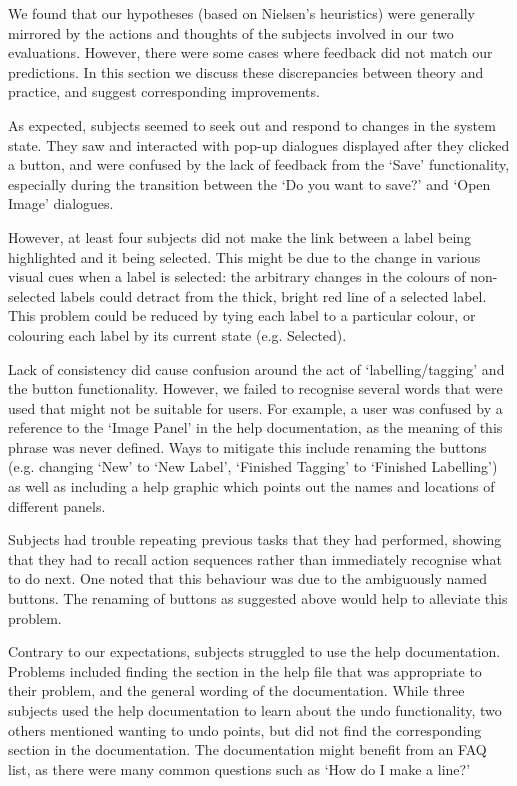 \documentclass[11pt,twocolumn]{article}
\begin{document}
We found that our hypotheses (based on Nielsen's heuristics) were generally
mirrored by the actions and thoughts of the subjects involved in our two
evaluations. However, there were some cases where feedback did not match our
predictions. In this section we discuss these discrepancies between theory and
practice, and suggest corresponding improvements.

As expected, subjects seemed to seek out and respond to changes in the system
state. They saw and interacted with pop-up dialogues displayed after they
clicked a button, and were confused by the lack of feedback from the `Save'
functionality, especially during the transition between the `Do you want to
save?' and `Open Image' dialogues. 

However, at least four subjects did not make the link between a label being
highlighted and it being selected. This might be due to the change in various
visual cues when a label is selected: the arbitrary changes in the colours of
non-selected labels could detract from the thick, bright red line of a selected
label. This problem could be reduced by tying each label to a particular
colour, or colouring each label by its current state (e.g. Selected).

Lack of consistency did cause confusion around the act of `labelling/tagging'
and the button functionality. However, we failed to recognise several words
that were used that might not be suitable for users. For example, a user was
confused by a reference to the `Image Panel' in the help documentation, as the
meaning of this phrase was never defined. Ways to mitigate this include
renaming the buttons (e.g. changing `New' to `New Label', `Finished Tagging' to
`Finished Labelling') as well as including a help graphic which points out the
names and locations of different panels.

Subjects had trouble repeating previous tasks that they had performed, showing
that they had to recall action sequences rather than immediately recognise
what to do next. One noted that this behaviour was due to the ambiguously named
buttons. The renaming of buttons as suggested above would help to alleviate
this problem. 
 
Contrary to our expectations, subjects struggled to use the help documentation.
Problems included finding the section in the help file that was appropriate to
their problem, and the general wording of the documentation. While three
subjects used the help documentation to learn about the undo functionality, two
others mentioned wanting to undo points, but did not find the corresponding
section in the documentation. The documentation might benefit from an FAQ list,
as there were many common questions such as `How do I make a line?'
\end{document}
